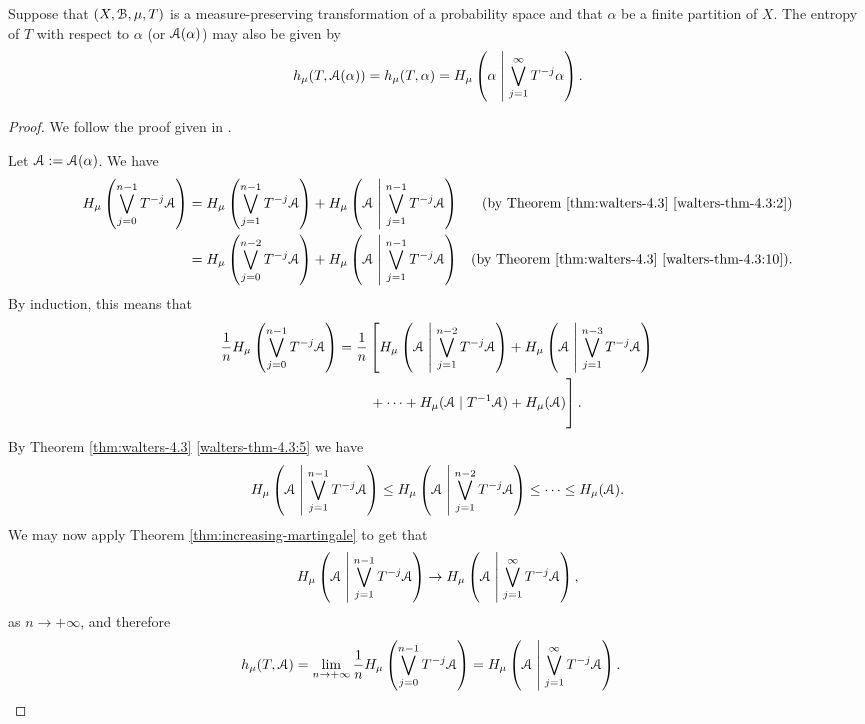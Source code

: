 \begin{theorem}
	Suppose that $(X, \mathcal{B}, \mu, T)$ is a measure-preserving transformation of a probability space and that $\alpha$ be a finite partition of $X$. The entropy of $T$ with respect to $\alpha$ (or $\mathcal{A}(\alpha)$) may also be given by
	\[
		h_\mu(T, \mathcal{A}(\alpha)) = h_\mu(T, \alpha) = H_\mu\left(\alpha \mathrel{}\middle|\mathrel{} \bigvee_{j = 1}^\infty {T^{-j}{\alpha}}\right).
	\]
	\begin{proof}
		We follow the proof given in \cite[Lecture 24]{ergodic-lectures}.
		
		Let $\mathcal{A} := \mathcal{A}(\alpha)$. We have
		\begin{align*}
			H_\mu\left(\bigvee_{j = 0}^{n - 1}{T^{-j}{\mathcal{A}}}\right) &= H_\mu\left(\bigvee_{j = 1}^{n - 1}{T^{-j}{\mathcal{A}}}\right) + H_\mu\left(\mathcal{A} \mathrel{}\middle|\mathrel{} \bigvee_{j = 1}^{n - 1}{T^{-j}{\mathcal{A}}}\right) & \text{(by Theorem \ref{thm:walters-4.3} \ref{walters-thm-4.3:2})} \\
				&= H_\mu\left(\bigvee_{j = 0}^{n - 2}{T^{-j}{\mathcal{A}}}\right) + H_\mu\left(\mathcal{A} \mathrel{}\middle|\mathrel{} \bigvee_{j = 1}^{n - 1}{T^{-j}{\mathcal{A}}}\right) & \text{(by Theorem \ref{thm:walters-4.3} \ref{walters-thm-4.3:10})}.
		\end{align*}
		By induction, this means that
		\begin{align*}
			\frac{1}{n} H_\mu\left(\bigjoin_{j = 0}^{n - 1}{T^{-j}{\A}}\right) &= \frac{1}{n}\left[H_\mu\left(\A \midmid \bigjoin_{j = 1}^{n - 2}{T^{-j}{\A}}\right) + H_\mu\left(\A \midmid \bigjoin_{j = 1}^{n - 3}{T^{-j}{\A}}\right)\right. \\
				& \left. \vphantom{\bigjoin_{j = 1}^{n - 2}{T^{-j}{\A}}} \qquad + \dots + H_\mu(\A \mid T^{-1}{\A}) + H_\mu(\A)\right].
		\end{align*}
		By Theorem \ref{thm:walters-4.3} \ref{walters-thm-4.3:5} we have
		\[
			H_\mu\left(\mathcal{A} \mathrel{}\middle|\mathrel{} \bigvee_{j = 1}^{n - 1}{T^{-j}{\mathcal{A}}}\right) \leq H_\mu\left(\mathcal{A} \mathrel{}\middle|\mathrel{} \bigvee_{j = 1}^{n - 2}{T^{-j}{\mathcal{A}}}\right) \leq \dots \leq H_\mu(\mathcal{A}).
		\]
		We may now apply Theorem \ref{thm:increasing-martingale} to get that
		\[
			H_\mu\left(\mathcal{A} \mathrel{}\middle|\mathrel{} \bigvee_{j = 1}^{n - 1}{T^{-j}{\mathcal{A}}}\right) \to H_\mu\left(\mathcal{A} \mathrel{}\middle|\mathrel{} \bigvee_{j = 1}^\infty{T^{-j}{\mathcal{A}}}\right),
		\]
		as $n \to +\infty$, and therefore
		\begin{align*}
			h_\mu(T, \mathcal{A}) = \lim_{n \to +\infty}{\frac{1}{n} H_\mu\left(\bigvee_{j = 0}^{n - 1}{}T^{-j}{\mathcal{A}}\right)} &= H_\mu\left(\mathcal{A} \mathrel{}\middle|\mathrel{} \bigvee_{j = 1}^\infty{T^{-j}{\mathcal{A}}}\right).
		\end{align*}
	\end{proof}
\end{theorem}

